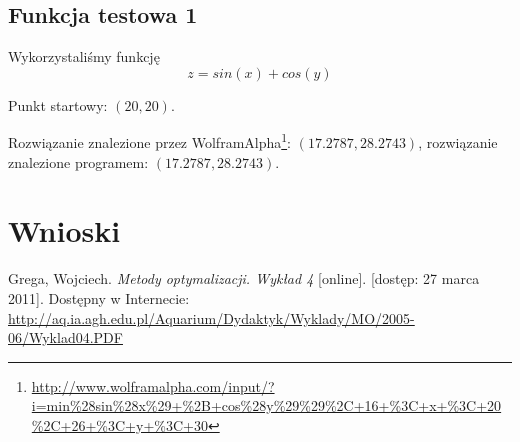 \documentclass{classrep}
\begin{document}
\subsection{Funkcja testowa 1}
Wykorzystaliśmy funkcję
\begin{equation}
  z = sin(x) + cos(y)
\end{equation}

Punkt startowy: $(20, 20)$.

Rozwiązanie znalezione przez WolframAlpha\footnote{\url{http://www.wolframalpha.com/input/?i=min\%28sin\%28x\%29+\%2B+cos\%28y\%29\%29\%2C+16+\%3C+x+\%3C+20\%2C+26+\%3C+y+\%3C+30}}: $(17.2787, 28.2743)$, rozwiązanie znalezione programem: $(17.2787, 28.2743)$.

\section{Wnioski}

\begin{thebibliography}{99}
Grega, Wojciech. \textit{Metody optymalizacji. Wykład 4} [online]. [dostęp: 27
marca 2011]. Dostępny w Internecie:
\url{http://aq.ia.agh.edu.pl/Aquarium/Dydaktyk/Wyklady/MO/2005-06/Wyklad04.PDF}
\end{thebibliography}
\end{document}

